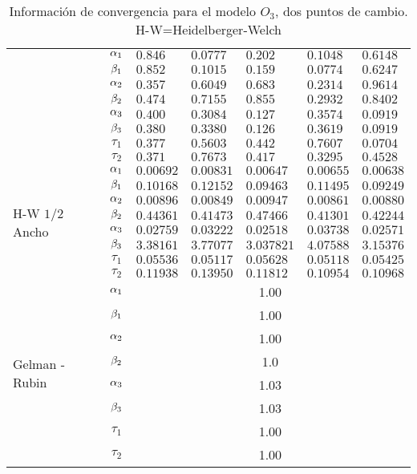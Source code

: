 \begin{table}[!h]
\begin{tabular}{|l|c|l|l|l|l|l|}
& $\alpha_1$ & $0.846 $ & $0.0777 $ & $0.202$ & $0.1048$  & $0.6148 $\\ 
\cline{2-7}
& $\beta_1$& $0.852  $ & $0.1015   $ & $ 0.159$ & $0.0774$ & $0.6247$\\
\cline{2-7}
& $\alpha_2$& $ 0.357 $ & $ 0.6049$ & $0.683$ & $ 0.2314$ & $0.9614$\\
\cline{2-7}
& $\beta_2$& $0.474 $ & $0.7155$ & $0.855 $ & $0.2932$ & $0.8402$\\
\cline{2-7}
& $\alpha_3$& $ 0.400 $ & $ 0.3084$ & $0.127 $ & $0.3574$ & $ 0.0919$\\
\cline{2-7}
& $\beta_3$& $ 0.380 $ & $ 0.3380$ & $0.126$ & $0.3619$ & $0.0919$\\
\cline{2-7}
& $\tau_1$& $0.377  $ & $ 0.5603 $ & $0.442 $ & $0.7607$ & $0.0704$\\
\cline{2-7}
& $\tau_2$& $0.371 $ & $ 0.7673 $ & $0.417 $ & $0.3295  $ & $ 0.4528 $\\
\cline{1-7}
\multirow{8}{2.5cm}{H-W $1/2$ Ancho} 

& $\alpha_1$ & $0.00692$ & $0.00831 $ & $0.00647$ & $0.00655$  & $ 0.00638$\\ 
\cline{2-7}
& $\beta_1$& $0.10168  $ & $0.12152$ & $0.09463$ & $0.11495$ & $0.09249 $\\
\cline{2-7}
& $\alpha_2$& $0.00896 $ & $0.00849$ & $0.00947 $ & $0.00861$ & $0.00880$\\
\cline{2-7}
& $\beta_2$& $0.44361$ & $0.41473$ & $0.47466$ & $0.41301$ & $ 0.42244$\\
\cline{2-7}
& $\alpha_3$& $0.02759 $ & $0.03222 $ & $0.02518 $ & $0.03738$ & $0.02571$\\
\cline{2-7}
& $\beta_3$& $3.38161$ & $3.77077$ & $3.03782 1$ & $4.07588$ & $3.15376$\\
\cline{2-7}
& $\tau_1$& $ 0.05536 $ & $0.05117$ & $0.05628$ & $0.05118$ & $0.05425 $\\
\cline{2-7}
& $\tau_2$& $0.11938 $ & $0.13950 $ & $0.11812 $ & $0.10954$ & $0.10968 $\\
\cline{1-7}
\multirow{8}{2.5cm}{Gelman - Rubin} 

& $\alpha_1$ & \multicolumn{5}{|c|}{1.00}\\ \cline{2-7}
&$\beta_1$ &  \multicolumn{5}{|c|}{1.00} \\ \cline{2-7}
&$\alpha_2$ &  \multicolumn{5}{|c|}{1.00} \\ \cline{2-7}
&$\beta_2$ &  \multicolumn{5}{|c|}{1.0} \\ \cline{2-7}
&$\alpha_3$ &  \multicolumn{5}{|c|}{1.03} \\ \cline{2-7}
&$\beta_3$ &  \multicolumn{5}{|c|}{1.03} \\ \cline{2-7}
&$\tau_1$ &  \multicolumn{5}{|c|}{1.00} \\ \cline{2-7}
&$\tau_2$ &  \multicolumn{5}{|c|}{1.00} \\ \cline{1-7}



\end{tabular}
\caption{Información de convergencia para el modelo $O_3$, dos puntos de cambio. H-W=Heidelberger-Welch}
\label{convergencia_dpdc_oz}
\end{table}





